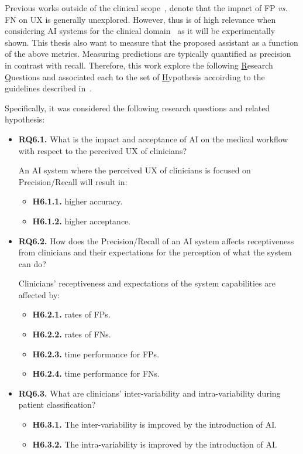 Previous works outside of the clinical scope~\cite{Kocielnik:2019:YAI:3290605.3300641, Dove:2017:UDI:3025453.3025739}, denote that the impact of \ac{FP} {\it vs.} \ac{FN} on \ac{UX} is generally unexplored.
However, thus is of high relevance when considering \ac{AI} systems for the clinical domain~\cite{boughey2016identification, dialani2015role} as it will be experimentally shown.
This thesis also want to measure that the proposed assistant as a function of the above metrics.
Measuring predictions are typically quantified as precision in contrast with recall.
Therefore, this work explore the following \underline{R}esearch \underline{Q}uestions and associated each to the set of \underline{H}ypothesis accoirding to the guidelines described in~\cite{10.1145/3290605.3300233, Kocielnik:2019:YAI:3290605.3300641}.

\noindent
Specifically, it was considered the following research questions and related hypothesis:

\begin{itemize}
\item {\bf RQ6.1.} What is the impact and acceptance of \ac{AI} on the medical workflow with respect to the perceived \ac{UX} of clinicians?

An AI system where the perceived \ac{UX} of clinicians is focused on Precision/Recall will result in:

\begin{itemize}
\item {\bf H6.1.1.} higher accuracy.
\item {\bf H6.1.2.} higher acceptance.
\end{itemize}
\item {\bf RQ6.2.} How does the Precision/Recall of an \ac{AI} system affects receptiveness from clinicians and their expectations for the perception of what the system can do?

Clinicians' receptiveness and expectations of the system capabilities are affected by:

\begin{itemize}
\item {\bf H6.2.1.} rates of \acp{FP}.
\item {\bf H6.2.2.} rates of \acp{FN}.
\item {\bf H6.2.3.} time performance for \acp{FP}.
\item {\bf H6.2.4.} time performance for \acp{FN}.
\end{itemize}
\item {\bf RQ6.3.} What are clinicians' inter-variability and intra-variability during patient classification?
\begin{itemize}
\item {\bf H6.3.1.} The inter-variability is improved by the introduction of \ac{AI}.
\item {\bf H6.3.2.} The intra-variability is improved by the introduction of \ac{AI}.
\end{itemize}
\end{itemize}

